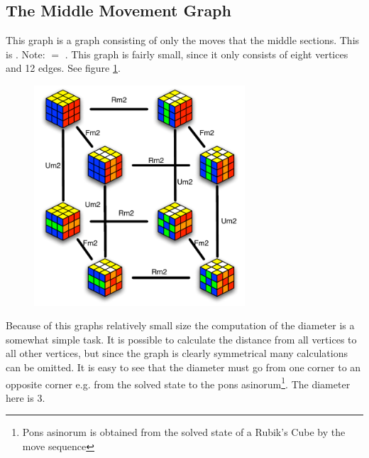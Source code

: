 \subsection{The Middle Movement Graph}
\label{sub:middleMoveGraph}
This graph is a \rubik{} graph consisting of only the moves that \twist{} the middle sections. 
This is . Note:  $=$ .  This graph is fairly small, since it only consists of eight vertices and 12 edges. See figure \ref{fig:graphMiddleSlice2}. \cite[pp. 158-167]{Rubik87}

\begin{figure}[bht!]
	\centering
		\includegraphics[width = 0.7\textwidth]{input/pics/graphMiddleSlice2.pdf}
	\caption{}
	\label{fig:graphMiddleSlice2}
\end{figure}

Because of this graphs relatively small size the computation of the diameter is a somewhat simple task. It is possible to calculate the distance from all vertices to all other vertices, but since the graph is clearly symmetrical many calculations can be omitted. It is easy to see that the diameter must go from one corner to an opposite corner e.g. from the solved state to the pons asinorum\footnote{Pons asinorum is obtained from the solved state of a Rubik's Cube by the move sequence }. The diameter here is 3. 

